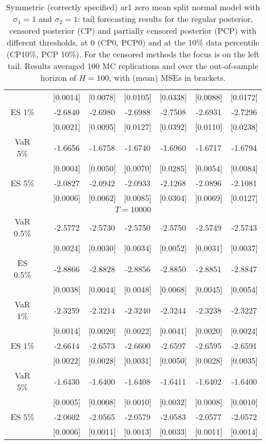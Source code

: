 {{\begin{table}
\begin{tabular}{cc cccccc}
  && [0.0014] & [0.0078] & [0.0105] & [0.0338] & [0.0088] & [0.0172] \\ 
\rowcolor{LightCyan} 
ES 1\% && -2.6840 & -2.6980 & -2.6988 & -2.7508 & -2.6931 & -2.7296 \\ 
  && [0.0021] & [0.0095] & [0.0127] & [0.0392] & [0.0110] & [0.0238] \\ [1ex]
\rowcolor{LightCyan} 
VaR 5\% && -1.6656 & -1.6758 & -1.6740 & -1.6960 & -1.6717 & -1.6794 \\ 
 && [0.0004] & [0.0050] & [0.0070] & [0.0285] & [0.0054] & [0.0084] \\ 
\rowcolor{LightCyan} 
ES 5\% && -2.0827 & -2.0942 & -2.0933 & -2.1268 & -2.0896 & -2.1081 \\ 
 && [0.0006] & [0.0062] & [0.0085] & [0.0304] & [0.0069] & [0.0127] \\ 
\hline 
\multicolumn{8}{c}{$T =10000$}  \\ 
\hline 
\rowcolor{LightCyan} 
VaR 0.5\% && -2.5772 & -2.5730 & -2.5750 & -2.5750 & -2.5749 & -2.5743 \\ 
  && [0.0024] & [0.0030] & [0.0034] & [0.0052] & [0.0031] & [0.0037] \\ 
\rowcolor{LightCyan} 
ES 0.5\% && -2.8866 & -2.8828 & -2.8856 & -2.8850 & -2.8851 & -2.8847 \\ 
  && [0.0038] & [0.0044] & [0.0048] & [0.0068] & [0.0045] & [0.0054] \\ [1ex]
\rowcolor{LightCyan} 
VaR 1\% && -2.3259 & -2.3214 & -2.3240 & -2.3244 & -2.3238 & -2.3227 \\ 
  && [0.0014] & [0.0020] & [0.0022] & [0.0041] & [0.0020] & [0.0024] \\ 
\rowcolor{LightCyan} 
ES 1\% && -2.6614 & -2.6573 & -2.6600 & -2.6597 & -2.6595 & -2.6591 \\ 
  && [0.0022] & [0.0028] & [0.0031] & [0.0050] & [0.0028] & [0.0035] \\ [1ex]
\rowcolor{LightCyan} 
VaR 5\% && -1.6430 & -1.6400 & -1.6408 & -1.6411 & -1.6402 & -1.6400 \\ 
 && [0.0005] & [0.0008] & [0.0010] & [0.0032] & [0.0008] & [0.0010] \\ 
\rowcolor{LightCyan} 
ES 5\% && -2.0602 & -2.0565 & -2.0579 & -2.0583 & -2.0577 & -2.0572 \\ 
 && [0.0006] & [0.0011] & [0.0013] & [0.0033] & [0.0011] & [0.0014] \\ 
\hline 
\end{tabular}
 \caption{Symmetric (correctly specified) ar1 zero mean split normal model with $\sigma_{1} = 1$ and $\sigma_{2} = 1$:  tail forecasting results for the regular posterior, censored posterior (CP)  and partially censored posterior (PCP) with different thresholds,  at $0$ (CP0, PCP0) and at the 10\% data percentile (CP10\%, PCP 10\%).  For the censored methods the focus is on the left tail.  Results averaged 100 MC replications and over the out-of-sample horizon of $H=100$,  with (mean) MSEs in brackets.} 
\label{tab:ar1_s1_pcp_var_es}  
\end{table}
}}